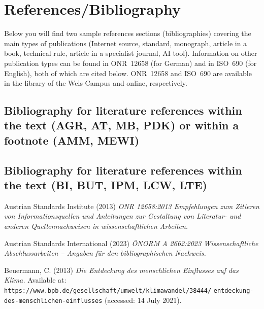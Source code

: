 \chapter{References/Bibliography}
\label{sec: Bibliography}


Below you will find two sample references sections (bibliographies) covering the main types of publications (Internet source, standard, monograph, article in a book, technical rule, article in a specialist journal, AI tool). Information on other publication types can be found in ONR~12658 (for German) and in ISO~690 (for English), both of which are cited below. ONR~12658 and ISO~690 are available in the library of the Wels Campus and online, respectively.

\setlength{\parindent}{0mm}
\section{Bibliography for literature references within the text (AGR, AT, MB, PDK) or within a footnote (AMM, MEWI)}

\printbibliography[heading=none,env=bibliographyAlpha]
\nocite{*}

\vspace{1mm}


\section{Bibliography for literature references within the text (BI, BUT, IPM, LCW, LTE)}

Austrian Standards Institute (2013) \textit{ONR 12658:2013 Empfehlungen zum Zitieren von Informationsquellen und Anleitungen zur Gestaltung von Literatur- und anderen Quellennachweisen in wissenschaftlichen Arbeiten.}

\vspace{1mm}
Austrian Standards International (2023) \textit{ÖNORM A 2662:2023 Wissenschaftliche Abschlussarbeiten – Angaben für den bibliographischen Nachweis.}

\vspace{1mm}
Beuermann, C. (2013) \textit{Die Entdeckung des menschlichen Einflusses auf das Klima.} Available at: 
\texttt{https://www.bpb.de/gesellschaft/umwelt/klimawandel/38444/}
\texttt{entdeckung-des-menschlichen-einflusses} (accessed: 14 July 2021).

